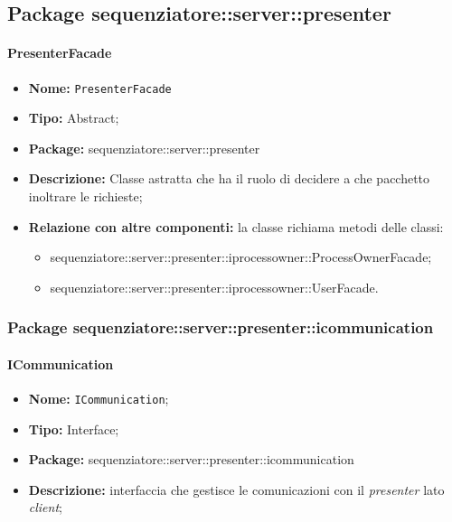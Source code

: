 \subsection{Package sequenziatore::server::presenter}
\paragraph{PresenterFacade}
	\begin{itemize}
		\item \textbf{Nome:} \texttt{PresenterFacade}
		\item \textbf{Tipo:} Abstract;
		\item \textbf{Package:} sequenziatore::server::presenter
		\item \textbf{Descrizione:} Classe astratta che ha il ruolo di decidere a che pacchetto inoltrare le richieste;
		\item \textbf{Relazione con altre componenti:} la classe richiama metodi delle classi:
		\begin{itemize}
			\item sequenziatore::server::presenter::iprocessowner::ProcessOwnerFacade;
			\item sequenziatore::server::presenter::iprocessowner::UserFacade.
		\end{itemize}
	\end{itemize}
\subsubsection{Package sequenziatore::server::presenter::icommunication}
\paragraph{ICommunication}
	\begin{itemize}
		\item \textbf{Nome:} \texttt{ICommunication};
		\item \textbf{Tipo:} Interface;
		\item \textbf{Package:} sequenziatore::server::presenter::icommunication
		\item \textbf{Descrizione:} interfaccia che gestisce le comunicazioni con il \textit{presenter} lato \textit{client};
	\end{itemize}
